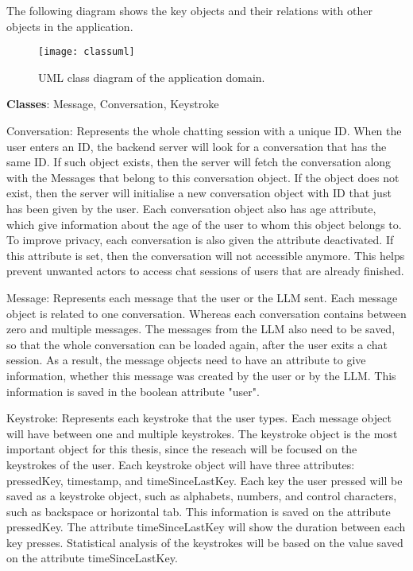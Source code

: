 The following diagram shows the key objects and their relations with other objects in the application.

\begin{figure}[h!]
    \centering
    \texttt{[image: classuml]}
    \caption{UML class diagram of the application domain.}
\end{figure}

\textbf{Classes}: Message, Conversation, Keystroke

Conversation: Represents the whole chatting session with a unique ID.
When the user enters an ID, the backend server will look for a conversation that has the same ID.
If such object exists, then the server will fetch the conversation along with the Messages that belong to this conversation object.
If the object does not exist, then the server will initialise a new conversation object with ID that just has been given by the user.
Each conversation object also has age attribute, which give information about the age of the user to whom this object belongs to.
To improve privacy, each conversation is also given the attribute deactivated.
If this attribute is set, then the conversation will not accessible anymore.
This helps prevent unwanted actors to access chat sessions of users that are already finished.

Message: Represents each message that the user or the \ac{LLM} sent.
Each message object is related to one conversation.
Whereas each conversation contains between zero and multiple messages.
The messages from the \ac{LLM} also need to be saved, so that the whole conversation can be loaded again, after the user exits a chat session.
As a result, the message objects need to have an attribute to give information, whether this message was created by the user or by the \ac{LLM}.
This information is saved in the boolean attribute "user".

Keystroke: Represents each keystroke that the user types.
Each message object will have between one and multiple keystrokes.
The keystroke object is the most important object for this thesis, since the reseach will be focused on the keystrokes of the user.
Each keystroke object will have three attributes: pressedKey, timestamp, and timeSinceLastKey.
Each key the user pressed will be saved as a keystroke object, such as alphabets, numbers, and control characters, such as backspace or horizontal tab.
This information is saved on the attribute pressedKey.
The attribute timeSinceLastKey will show the duration between each key presses.
Statistical analysis of the keystrokes will be based on the value saved on the attribute timeSinceLastKey. 

